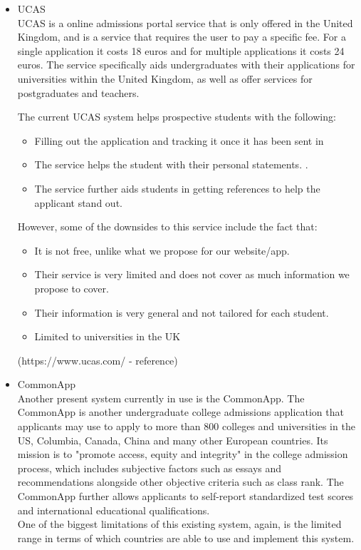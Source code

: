 \documentclass[a4paper, 12pt]{article}
\begin{document}
\begin{itemize}
\item UCAS \\

UCAS is a online admissions portal service that is only offered in the United Kingdom, and is a service that requires the user to pay a specific fee. For a single application it costs 18 euros and for multiple applications it costs 24 euros. The service specifically aids undergraduates with their applications for universities within the United Kingdom, as well as offer services for postgraduates and teachers.

The current UCAS system helps prospective students with the following:

\begin{itemize}
\item Filling out the application and tracking it once it has been sent in 
\item The service helps the student with their personal statements. .
\item The service further aids students in getting references to help the applicant stand out.
\end{itemize}

However, some of the downsides to this service include the fact that:

\begin{itemize}
\item It is not free, unlike what we propose for our website/app.
\item Their service is very limited and does not cover as much information we propose to cover.
\item Their information is very general and not tailored for each student. 
\item Limited to universities in the UK
\end{itemize}


(https://www.ucas.com/ - reference) \\

\item CommonApp \\

Another present system currently in use is the CommonApp. The CommonApp is another undergraduate college admissions application that applicants may use to apply to more than 800 colleges and universities in the US, Columbia, Canada, China and many other European countries. Its mission is to "promote access, equity and integrity" in the college admission process, which includes subjective factors such as essays and recommendations alongside other objective criteria such as class rank. The CommonApp further allows applicants to self-report standardized test scores and international educational qualifications. \\

One of the biggest limitations of this existing system, again, is the limited range in terms of which countries are able to use and implement this system. 

\end{itemize}
\end{document}
